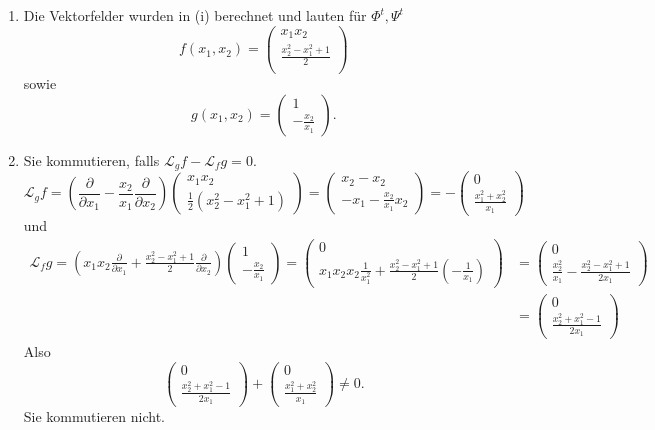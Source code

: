 \documentclass{article}
\theoremstyle{named}
\begin{document}
\begin{enumerate}[label=(\roman*)]
	\item Die Vektorfelder wurden in (i) berechnet und lauten für $\Phi^t, \Psi^t$
	\[
		f(x_1, x_2) = \begin{pmatrix}
			x_1x_2 \\
			\frac{x_2^2-x_1^2+1}{2} \\
		\end{pmatrix} 
	\] sowie
	\[
		g(x_1,x_2) = \begin{pmatrix}
			1 \\ -\frac{x_2}{x_1}
		\end{pmatrix}.
	\]
	
	\item Sie kommutieren, falls $\mathcal L_gf - \mathcal L_fg = 0$. 
	\[
		\mathcal L_gf = (\frac{\partial}{\partial x_1} - \frac{x_2}{x_1}\frac{\partial}{\partial x_2}) \begin{pmatrix}
			x_1x_2 \\ \frac{1}{2}(x_2^2-x_1^2+1) 
		\end{pmatrix}
		= \begin{pmatrix}
			x_2 - x_2 \\
			-x_1 - \frac{x_2}{x_1}x_2
		\end{pmatrix} = 
		-\begin{pmatrix}
			0 \\ \frac{x_1^2+x_2^2}{x_1}
		\end{pmatrix}
	\]
	und 
	\begin{align*}
		\mathcal L_fg = (x_1x_2\frac{\partial}{\partial x_1} + \frac{x_2^2-x_1^2+1}{2}\frac{\partial}{\partial x_2})\begin{pmatrix}
		1 \\
		-\frac{x_2}{x_1}
		\end{pmatrix} =
		\begin{pmatrix}
			0 \\
			x_1x_2x_2 \frac{1}{x_1^2} +  \frac{x_2^2-x_1^2+1}{2}(-\frac{1}{x_1})
		\end{pmatrix} &= 
		\begin{pmatrix}
			0 \\
			\frac{x_2^2}{x_1} - \frac{x_2^2-x_1^2+1}{2x_1}
		\end{pmatrix}\\ &=
		\begin{pmatrix}
		0 \\
			\frac{x_2^2+x_1^2-1}{2x_1}
		\end{pmatrix}
	\end{align*}
	Also 
	\[
	\begin{pmatrix}
	0 \\
	\frac{x_2^2+x_1^2-1}{2x_1}
	\end{pmatrix} 
		+\begin{pmatrix}
		0 \\ \frac{x_1^2+x_2^2}{x_1}
		\end{pmatrix} \neq 0.
	\]
	Sie kommutieren nicht.
\end{enumerate}
\end{document}
